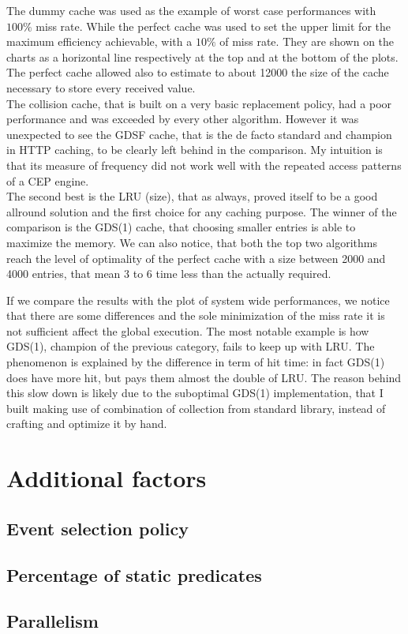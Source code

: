 The dummy cache was used as the example of worst case performances with $100\%$ miss rate. While the perfect cache was used to set the upper limit for the maximum efficiency achievable, with a $10\%$ of miss rate. They are shown on the charts as a horizontal line respectively at the top and at the bottom of the plots. The perfect cache allowed also to estimate to about 12000 the size of the cache necessary to store every received value.\\
The collision cache, that is built on a very basic replacement policy, had a poor performance and was exceeded by every other algorithm. However it was unexpected to see the GDSF cache, that is the de facto standard and champion in HTTP caching, to be clearly left behind in the comparison. My intuition is that its measure of frequency did not work well with the repeated access patterns of a CEP engine.\\
The second best is the LRU (size), that as always, proved itself to be a good allround solution and the first choice for any caching purpose. The winner of the comparison is the GDS(1) cache, that choosing smaller entries is able to maximize the memory. We can also notice, that both the top two algorithms reach the level of optimality of the perfect cache with a size between 2000 and 4000 entries, that mean 3 to 6 time less than the actually required.

If we compare the results with the plot of system wide performances, we notice that there are some differences and the sole minimization of the miss rate it is not sufficient affect the global execution. The most notable example is how GDS(1), champion of the previous category, fails to keep up with LRU. The phenomenon is explained by the difference in term of hit time: in fact GDS(1) does have more hit, but pays them almost the double of LRU. The reason behind this slow down is likely due to the suboptimal GDS(1) implementation, that I built making use of combination of collection from standard library, instead of crafting and optimize it by hand.

\section{Additional factors}
\subsection{Event selection policy}
\subsection{Percentage of static predicates}
\subsection{Parallelism}
